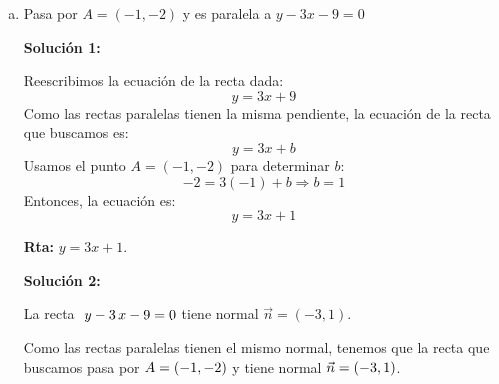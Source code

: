 \documentclass[11pt]{article}
\newcommand{\indicador}[4]{
{\tikz[remember picture,overlay]\coordinate (#1) at #2;}{\tikz[remember picture,overlay]\coordinate (#3) at #4;} 
}
\begin{document}
\begin{enumerate}[\hspace{-5mm} 1) ]
\begin{enumerate}[(a)]
\begin{center}

 \end{center}
\hfill{\bf Rta: } $y = \tfrac{1}{3} x $.


\medskip 

\item Pasa por $A = (-1,-2)$ y es paralela a $y - 3x - 9 = 0$

\begin{minipage}{.4\textwidth}
{\bf Solución 1:}

Reescribimos la ecuación de la recta dada:
\[ y = 3x + 9 \]
Como las rectas paralelas tienen la misma pendiente, la ecuación de la recta que buscamos es:
\[ y = 3x + b \]
Usamos el punto $A=(-1,-2)$ para determinar $b$:
\[ -2 = 3(-1) + b \Rightarrow b = 1 \]
Entonces, la ecuación es:
\[ y = 3x + 1 \]

\hfill{\bf Rta: } $y = 3x + 1 $.
\end{minipage}\qquad\begin{minipage}{.5\textwidth}
{\bf Solución 2:}

La recta $\ \indicador{aa}{(-.1,-.15)}{aa1}{(-.2,-.4)}y - 3\indicador{ab}{(-.1,-.15)}{ab1}{(-.2,-.4)} \,x - 9 = 0$ tiene normal $\vec{n}= (-3,1)$.

\bigskip   
\bigskip  

Como las rectas paralelas tienen el mismo normal, tenemos que la recta que buscamos pasa por \linebreak $A=(-1\indicador{a}{(-.1,-.15)}{a1}{(-.2,-.4)}
  ,-2\indicador{b}{(-.1,-.1)}{b1}{(.1,-.4)}
  )$ y tiene normal $\vec{n} = (-3\indicador{u}{(-.1,-.1)}{u1}{(-.2,-.4)} ,1 \indicador{uu}{(-.1,-.1)}{uu1}{(.1,-.4)} 
  )$.


\end{minipage}
\end{enumerate}
\end{enumerate}
\end{document}
